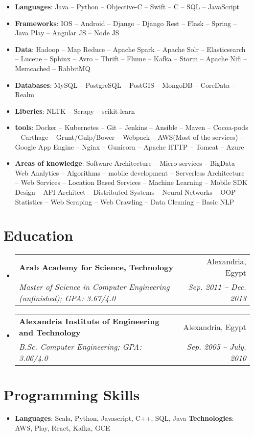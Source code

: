 \documentclass[letterpaper,11pt]{article}
\makeatletter
\newcommand{\resumeItem}[2]{
  \item\small{
    \textbf{#1}{: #2 \vspace{-2pt}}
  }
}
\newcommand{\resumeSubheading}[4]{
  \vspace{-1pt}\item
    \begin{tabular*}{0.97\textwidth}{l@{\extracolsep{\fill}}r}
      \textbf{#1} & #2 \\
      \textit{\small#3} & \textit{\small #4} \\
    \end{tabular*}\vspace{-5pt}
}
\newcommand{\resumeSubHeadingListStart}{\begin{itemize}[leftmargin=*]}
\newcommand{\resumeSubHeadingListEnd}{\end{itemize}}
\makeatother
\begin{document}
  \resumeSubHeadingListStart
    \resumeItem{Languages}{Java -- Python -- Objective-C -- Swift -- C -- SQL -- JavaScript}
    \resumeItem{Frameworks}{IOS -- Android -- Django -- Django Rest -- Flask -- Spring -- Java Play -- Angular JS -- Node JS}
    \resumeItem{Data}{Hadoop -- Map Reduce -- Apache Spark -- Apache Solr -- Elasticsearch -- Lucene -- Sphinx -- Avro -- Thrift -- Flume -- Kafka -- Storm -- Apache Nifi -- Memcached -- RabbitMQ}
    \resumeItem{Databases}{MySQL -- PostgreSQL -- PostGIS  -- MongoDB -- CoreData -- Realm}
    \resumeItem{Liberies}{NLTK -- Scrapy -- scikit-learn}
    \resumeItem{tools}{Docker -- Kubernetes -- Git -- Jenkins -- Ansible -- Maven -- Cocoa-pods -- Carthage -- Grunt/Gulp/Bower -- Webpack -- AWS(Most of the services) -- Google App Engine -- Nginx -- Gunicorn -- Apache HTTP -- Tomcat -- Azure} 
    \resumeItem{Areas of knowledge}{Software Architecture -- Micro-services -- BigData -- Web Analytics -- Algorithms -- mobile development -- Serverless Architecture -- Web Services -- Location Based Services -- Machine Learning -- Mobile SDK Design -- API Architect -- Distributed Systems -- Neural Networks -- OOP -- Statistics -- Web Scraping -- Web Crawling -- Data Cleaning -- Basic NLP}

  \resumeSubHeadingListEnd

\section{Education}
  \resumeSubHeadingListStart
    \resumeSubheading
      {Arab Academy for Science, Technology}{Alexandria, Egypt}
      {Master of Science in Computer Engineering (unfinished);  GPA: 3.67/4.0}{Sep. 2011 -- Dec. 2013}
    \resumeSubheading
      {Alexandria Institute of Engineering and Technology}{Alexandria, Egypt}
      {B.Sc. Computer Engineering;  GPA: 3.06/4.0}{Sep. 2005 -- July. 2010}
  \resumeSubHeadingListEnd


%
\section{Programming Skills}
 \resumeSubHeadingListStart
   \item{
     \textbf{Languages}{: Scala, Python, Javascript, C++, SQL, Java}
     \hfill
     \textbf{Technologies}{: AWS, Play, React, Kafka, GCE}
   }
 \resumeSubHeadingListEnd


\end{document}
